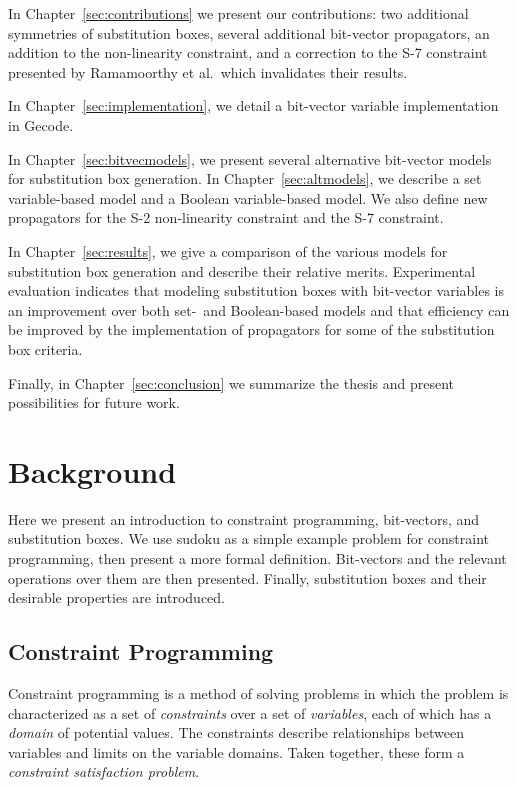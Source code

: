 \documentclass[a4paper,10pt,twoside,openright]{book}
\begin{document}
In Chapter~\ref{sec:contributions} we present our contributions: 
two additional symmetries of substitution boxes,
several additional bit-vector propagators, 
an addition to the non-linearity constraint,
and
a correction to the S-7 constraint presented by Ramamoorthy et al.\ which invalidates their results.

In Chapter~\ref{sec:implementation}, we detail a bit-vector variable implementation in Gecode. 

In Chapter~\ref{sec:bitvecmodels}, we present several alternative bit-vector models
for substitution box generation. 
In Chapter~\ref{sec:altmodels}, we describe a set variable-based model 
and a Boolean variable-based model.
We also define new propagators for the S-2 non-linearity constraint
and the S-7 constraint.

In Chapter~\ref{sec:results}, we give a comparison of the various models for substitution box generation and describe their relative merits.
Experimental evaluation indicates that modeling substitution boxes with bit-vector variables is an improvement 
over both set-\ and Boolean-based models and
that efficiency can be improved by 
the implementation of propagators for some of the substitution box criteria.

Finally, in Chapter~\ref{sec:conclusion} we summarize the thesis and present
possibilities for future work.

\chapter{Background}
\label{sec:background}
Here we present an introduction to constraint programming, bit-vectors, and substitution boxes.
We use sudoku as a simple example problem for constraint programming, then present a more formal definition.
Bit-vectors and the relevant operations over them are then presented.
Finally, substitution boxes and their desirable properties are introduced.

\section{Constraint Programming}
Constraint programming is a method of solving problems in which the problem is characterized as a set of \textit{constraints} over a set of \textit{variables}, each of which has a \textit{domain} of potential values. The constraints describe relationships between variables and limits on the variable domains. Taken together, these form a \textit{constraint satisfaction problem}.
\end{document}
